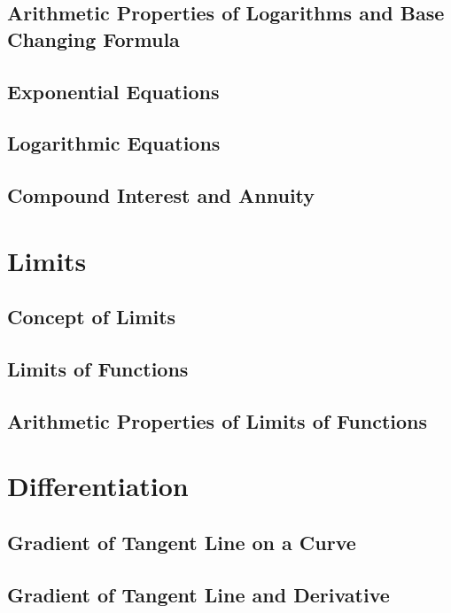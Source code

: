 \documentclass[12pt]{report}
\begin{document}
\section{Arithmetic Properties of Logarithms and Base Changing Formula}

\section{Exponential Equations}

\section{Logarithmic Equations}

\section{Compound Interest and Annuity}

\chapter{Limits}

\section{Concept of Limits}

\section{Limits of Functions}

\section{Arithmetic Properties of Limits of Functions}

\chapter{Differentiation}

\section{Gradient of Tangent Line on a Curve}

\section{Gradient of Tangent Line and Derivative}
\end{document}

